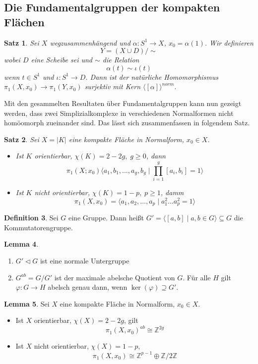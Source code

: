 \documentclass[a4paper, 12pt]{article}
\theoremstyle{plain}
\newtheorem{theorem}{Satz}[section] %
\theoremstyle{definition}
\newtheorem{definition}[theorem]{Definition} %
\theoremstyle{lemma}
\newtheorem{lemma}[theorem]{Lemma}
\theoremstyle{remark}
\theoremstyle{corollary}
\theoremstyle{example}
\begin{document}
\subsection{Die Fundamentalgruppen der kompakten Flächen}
	\begin{theorem}
		Sei $X$ wegzusammenhängend und $\alpha: S^1 \to X$, $x_0 = \alpha(1)$. Wir definieren \[Y = (X \cup D)/\sim\] wobei $D$ eine Scheibe sei und $\sim$ die Relation \[\alpha(t) \sim \iota(t)\] wenn $t \in S^1$ und $\iota: S^1 \to D$. Dann ist der natürliche Homomorphismus $\pi_1(X,x_0) \to \pi_1(Y,x_0)$ surjektiv mit Kern $\langle[\alpha]\rangle^{norm}$.
	\end{theorem}
	Mit den gesammelten Resultaten über Fundamentalgruppen kann nun gezeigt werden, dass zwei Simplizialkomplexe in verschiedenen Normalformen nicht homöomorph zueinander sind. Das lässt sich zusammenfassen in folgendem Satz.
	\begin{theorem}
		Sei $X=\left|K\right|$ eine kompakte Fläche in Normalform, $x_0 \in X$. \begin{itemize}
			\item Ist $K$ orientierbar, $\chi(K) = 2-2g, \; g\geq 0$, dann \[\pi_1(X;x_0) \langle a_1, b_1,...,a_g,b_g \mid \prod_{i=1}^g [a_i,b_i] = 1 \rangle\]
			\item Ist $K$ nicht orientierbar, $\chi(K) = 1-p, \; p \geq 1$, damm \[\pi_1(X,x_0) = \langle a_1,a_2,...,a_p \mid a_1^2 ... a_p^2 = 1 \rangle\]
		\end{itemize}
	\end{theorem}
	\begin{definition}
		Sei $G$ eine Gruppe. Dann heißt $G' = \langle [a,b] \mid a,b \in G \rangle \subseteq G$ die Kommutatorengruppe. 
	\end{definition}
	\begin{lemma}
		\begin{enumerate}
			\item $G' \triangleleft G$ ist eine normale Untergruppe
			\item $G^{ab} = G/G'$ ist der maximale abelsche Quotient von $G$. Für alle $H$ gilt $\varphi: G \to H$ abelsch genau dann, wenn $\ker(\varphi) \supseteq G'$. 
		\end{enumerate}
	\end{lemma}
	\begin{lemma}
		Sei $X$ eine kompakte Fläche in Normalform, $x_0 \in X$. \begin{itemize}
			\item Ist $X$ orientierbar, $\chi(X) = 2-2g$, gilt \[\pi_1(X,x_0)^{ab} \cong \mathbb{Z}^{2g}\]
			\item Ist $X$ nicht orientierbar, $\chi(X) = 1-p$, $$\pi_1(X,x_0) \cong \mathbb{Z}^{p-1} \oplus \mathbb{Z}/2\mathbb{Z}$$
		\end{itemize}
	\end{lemma}
\end{document}
